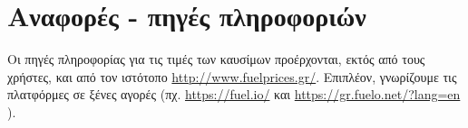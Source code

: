 \section{Αναφορές - πηγές πληροφοριών}



Οι πηγές πληροφορίας για τις τιμές των καυσίμων προέρχονται, εκτός από τους χρήστες, και από τον ιστότοπο \href{http://www.fuelprices.gr/}{http://www.fuelprices.gr/}. Επιπλέον, γνωρίζουμε τις πλατφόρμες σε ξένες αγορές (πχ. \href{https://fuel.io/}{https://fuel.io/} και  \href{https://gr.fuelo.net/?lang=en}{https://gr.fuelo.net/?lang=en} ).
